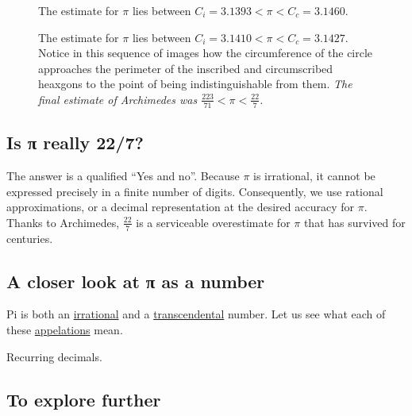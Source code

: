 \documentclass[
  a4paper,
]{article}
\begin{document}
\begin{figure}
\centering

\caption{The estimate for \(\pi\) lies between
\(C_i = 3.1393 < \pi < C_c = 3.1460\).}\label{fig:forty-eight-gon}
\end{figure}

\begin{figure}
\centering

\caption{The estimate for \(\pi\) lies between
\(C_i = 3.1410 < \pi < C_c = 3.1427\). Notice in this sequence of images
how the circumference of the circle approaches the perimeter of the
inscribed and circumscribed heaxgons to the point of being
indistinguishable from them. \emph{The final estimate of Archimedes was
\(\frac{223}{71} < \pi < \frac{22}{7}\).}}\label{fig:ninety-six-gon}
\end{figure}

\subsection{Is π really 22/7?}\label{is-ux3c0-really-227}

The answer is a qualified ``Yes and no''. Because \(\pi\) is irrational,
it cannot be expressed precisely in a finite number of digits.
Consequently, we use rational approximations, or a decimal
representation at the desired accuracy for \(\pi\). Thanks to
Archimedes, \(\frac{22}{7}\) is a serviceable overestimate for \(\pi\)
that has survived for centuries.

\subsection{A closer look at π as a
number}\label{a-closer-look-at-ux3c0-as-a-number}

Pi is both an
\href{https://en.wikipedia.org/wiki/Irrational_number}{irrational} and a
\href{https://en.wikipedia.org/wiki/Transcendental_number}{transcendental}
number. Let us see what each of these
\href{https://www.merriam-webster.com/dictionary/appellation}{appelations}
mean.

Recurring decimals.

\subsection{To explore further}\label{to-explore-further}
\end{document}

